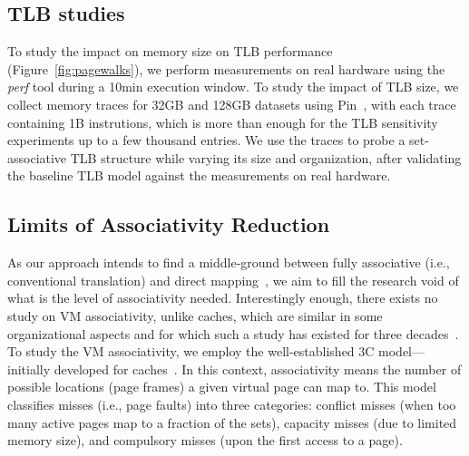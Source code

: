 \subsection{TLB studies}
To study the impact on memory size on  TLB performance (Figure~\ref{fig:pagewalks}), we perform measurements on real hardware using the \textit{perf} tool during a 10min execution window. To study the impact of TLB size, we collect memory traces for 32GB and 128GB datasets using Pin~\cite{luk:pin}, with each trace containing 1B instrutions, which is more than enough for the TLB sensitivity experiments up to a few thousand entries. We use the traces to probe a set-associative TLB structure while varying its size and organization, after validating the baseline TLB model against the measurements on real hardware. 

\subsection{Limits of Associativity Reduction}


As our approach intends to find a middle-ground between fully associative (i.e., conventional translation) and direct mapping~\cite{picorel:near-memory, haria:devirtualizing}, we aim to fill the research void of what is the level of associativity needed. Interestingly enough, there exists no study on VM associativity, unlike caches, which are similar in some organizational aspects and for which such a study has existed for three decades~\cite{hill:aspects}. To study the VM associativity, we employ the well-established 3C model---initially developed for caches~\cite{hill:aspects}. In this context, associativity means the number of possible locations (page frames) a given virtual page can map to. This model classifies misses (i.e., page faults) into three categories: conflict misses (when too many active pages map to a fraction of the sets), capacity misses (due to limited memory size), and compulsory misses (upon the first access to a page). 

